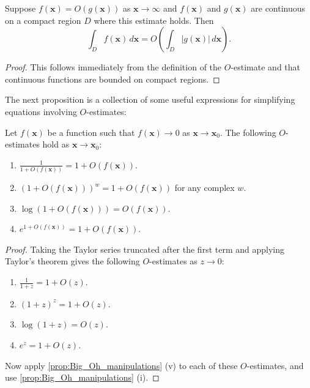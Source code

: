       \begin{proposition}
        Suppose $f(\mathbf{x}) = O(g(\mathbf{x}))$ as $\mathbf{x} \to \infty$ and $f(\mathbf{x})$ and $g(\mathbf{x})$ are continuous on a compact region $D$ where this estimate holds. Then
        \[
          \int_{D}f(\mathbf{x})\,d\mathbf{x} = O\left(\int_{D}|g(\mathbf{x})|\,d\mathbf{x}\right).
        \]
      \end{proposition}
      \begin{proof}
        This follows immediately from the definition of the $O$-estimate and that continuous functions are bounded on compact regions.
      \end{proof}

      The next proposition is a collection of some useful expressions for simplifying equations involving $O$-estimates:

      \begin{proposition}
        Let $f(\mathbf{x})$ be a function such that $f(\mathbf{x}) \to 0$ as $\mathbf{x} \to \mathbf{x}_{0}$. The following $O$-estimates hold as $\mathbf{x} \to \mathbf{x}_{0}$:
        \begin{enumerate}[label=(\roman*)]
          \item $\frac{1}{1+O(f(\mathbf{x}))} = 1+O(f(\mathbf{x}))$.
          \item $(1+O(f(\mathbf{x})))^{w} = 1+O(f(\mathbf{x}))$ for any complex $w$.
          \item $\log(1+O(f(\mathbf{x}))) = O(f(\mathbf{x}))$.
          \item $e^{1+O(f(\mathbf{x}))} = 1+O(f(\mathbf{x}))$.
        \end{enumerate}
      \end{proposition}
      \begin{proof}
        Taking the Taylor series truncated after the first term and applying Taylor's theorem gives the following $O$-estimates as $z \to 0$:
        \begin{enumerate}[label=(\roman*)]
          \item $\frac{1}{1+z} = 1+O(z)$.
          \item $(1+z)^{z} = 1+O(z)$.
          \item $\log(1+z) = O(z)$.
          \item $e^{z} = 1+O(z)$.
        \end{enumerate}
        Now apply \cref{prop:Big_Oh_manipulations} (v) to each of these $O$-estimates, and use \cref{prop:Big_Oh_manipulations} (i).
      \end{proof}

